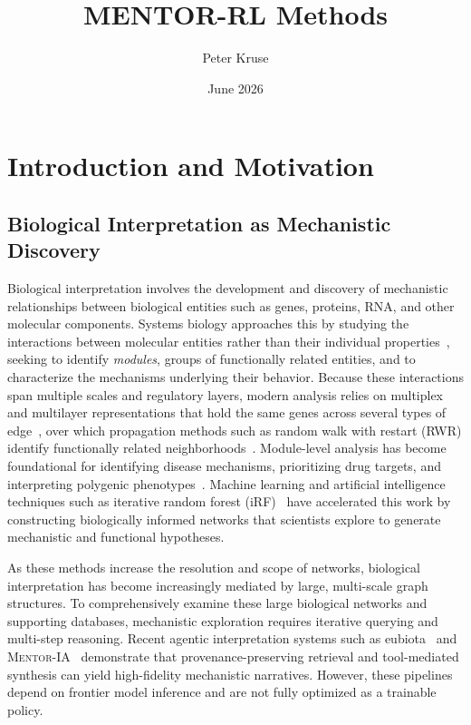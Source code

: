 \documentclass[thesis,letterpaper,12pt]{utthesis}
\title{MENTOR-RL Methods}
\author{Peter Kruse}
\date{June 2026}
\begin{document}
\maketitle

\section{Introduction and Motivation}

\subsection{Biological Interpretation as Mechanistic Discovery}
Biological interpretation involves the development and discovery of mechanistic relationships between biological entities such as genes, proteins, RNA, and other molecular components. Systems biology approaches this by studying the interactions between molecular entities rather than their individual properties~\cite{hartwell1999molecular, barabasi2004network}, seeking to identify \textit{modules}, groups of functionally related entities, and to characterize the mechanisms underlying their behavior. Because these interactions span multiple scales and regulatory layers, modern analysis relies on multiplex and multilayer representations that hold the same genes across several types of edge~\cite{barabasi2011network, ideker2012differential, mucha2010community, de2013mathematical}, over which propagation methods such as random walk with restart (RWR) identify functionally related neighborhoods~\cite{kohler2008walking, cowen2017network}. Module-level analysis has become foundational for identifying disease mechanisms, prioritizing drug targets, and interpreting polygenic phenotypes~\cite{menche2015uncovering}. Machine learning and artificial intelligence techniques such as iterative random forest (iRF)~\cite{basu2018iterative, cliff2019high} have accelerated this work by constructing biologically informed networks that scientists explore to generate mechanistic and functional hypotheses.

As these methods increase the resolution and scope of networks, biological interpretation has become increasingly mediated by large, multi-scale graph structures. To comprehensively examine these large biological networks and supporting databases, mechanistic exploration requires iterative querying and multi-step reasoning. Recent agentic interpretation systems such as eubiota~\cite{eubiota} and \textsc{Mentor-IA}~\cite{mentor-ia} demonstrate that provenance-preserving retrieval and tool-mediated synthesis can yield high-fidelity mechanistic narratives. However, these pipelines depend on frontier model inference and are not fully optimized as a trainable policy.
\end{document}
